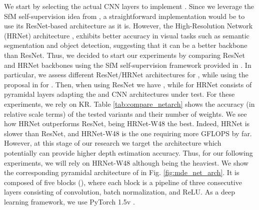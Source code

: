 \documentclass[journal]{IEEEtran}
\newcommand{\Fig}[1]{Fig. \ref{fig:#1}}
\begin{document}
We start by selecting the actual CNN layers to implement . Since we leverage the SfM self-supervision idea from \cite{Godard:2019MonoDepth2}, a straightforward implementation would be to use its ResNet-based architecture as it is. However, the High-Resolution Network (HRNet) architecture \cite{Wang:2020HrNet}, exhibits better accuracy in visual tasks such as semantic segmentation and object detection, suggesting that it can be a better backbone than ResNet. Thus, we decided to start our experiments by comparing ResNet and HRNet backbones using the SfM self-supervision framework provided in \cite{Godard:2019MonoDepth2}. In particular, we assess different ResNet/HRNet architectures for , while using the proposal in \cite{Godard:2019MonoDepth2} for . Then, when using ResNet we have , while for HRNet  consists of pyramidal layers adapting the  and  CNN architectures under test. For these experiments, we rely on KR. Table \ref{tab:compare_netarch} shows the accuracy (in relative scale terms) of the tested variants and their number of weights. We see how HRNet outperforms ResNet, being HRNet-W48 the best. Indeed, HRNet is slower than ResNet, and HRNet-W48 is the one requiring more GFLOPS by far. However, at this stage of our research we target the architecture which potentially can provide higher depth estimation accuracy. Thus, for our following experiments, we will rely on HRNet-W48 although being the heaviest. We show the corresponding pyramidal architecture of  in \Fig{mde_net_arch}. It is composed of five blocks (), where each block is a pipeline of three consecutive layers consisting of convolution, batch normalization, and ReLU. As a deep learning framework, we use PyTorch 1.5v \cite{Paszke:2019pytorch}.
\end{document}
